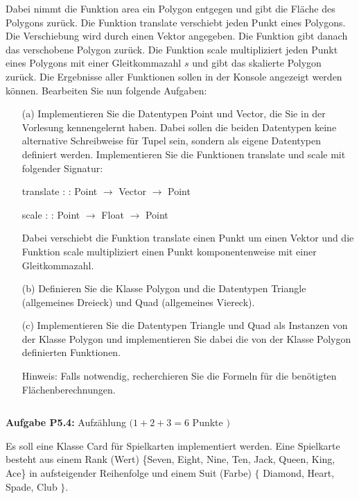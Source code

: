 Dabei nimmt die Funktion area ein Polygon entgegen und gibt die Fläche des Polygons zurück. Die Funktion translate 
verschiebt jeden Punkt eines Polygons. Die Verschiebung wird durch einen Vektor angegeben. Die Funktion gibt danach das verschobene 
Polygon zurück. Die Funktion scale multipliziert jeden Punkt eines Polygons mit einer Gleitkommazahl $s$ und gibt das skalierte Polygon 
zurück. Die Ergebnisse aller Funktionen sollen in der Konsole angezeigt werden können. Bearbeiten Sie nun folgende Aufgaben:

\begin{itemize}
  \item [(a)] Implementieren Sie die Datentypen Point und Vector, die Sie in der Vorlesung kennengelernt haben. Dabei sollen die beiden Datentypen keine alternative Schreibweise für Tupel sein, sondern als eigene Datentypen definiert werden. Implementieren Sie die Funktionen translate und scale mit folgender Signatur:

  translate : : Point $\rightarrow$ Vector $\rightarrow$ Point
  
  scale : : Point $\rightarrow$ Float $\rightarrow$ Point
  
  Dabei verschiebt die Funktion translate einen Punkt um einen Vektor und die Funktion scale multipliziert einen Punkt komponentenweise mit einer Gleitkommazahl.

  \item [(b)] Definieren Sie die Klasse Polygon und die Datentypen Triangle (allgemeines Dreieck) und Quad (allgemeines Viereck).

  \item [(c)] Implementieren Sie die Datentypen Triangle und Quad als Instanzen von der Klasse Polygon und implementieren Sie dabei die von der Klasse Polygon definierten Funktionen.

Hinweis: Falls notwendig, recherchieren Sie die Formeln für die benötigten Flächenberechnungen.

\inputminted{Haskell}{A5_3.hs}
\end{itemize}

\newpage

\textbf{Aufgabe P5.4:} Aufzählung $(1+2+3=6$ Punkte $)$

Es soll eine Klasse Card für Spielkarten implementiert werden. Eine Spielkarte besteht aus einem Rank (Wert) \{Seven, Eight, Nine, Ten, Jack, Queen, King, Ace\} in aufsteigender Reihenfolge und einem Suit (Farbe) $\{$ Diamond, Heart, Spade, Club $\}$.


